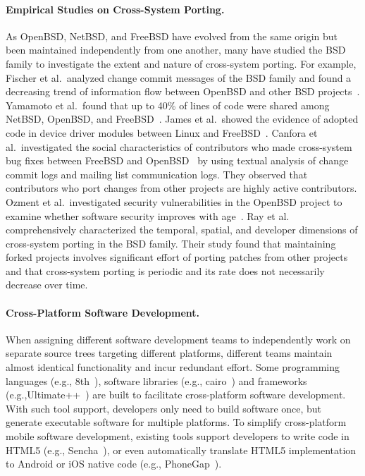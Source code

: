 \paragraph{{Empirical Studies on Cross-System Porting.}}
As OpenBSD, NetBSD, and FreeBSD have evolved from the same origin but been maintained independently from one another, many have studied the BSD family to investigate the extent and nature of cross-system porting. For example, Fischer et al.~analyzed change commit messages of the BSD family and found a decreasing trend of information flow between OpenBSD and other BSD projects~\cite{Fischer2005}. Yamamoto et al.~found that up to 40\% of lines of code were shared among NetBSD, OpenBSD, and FreeBSD~\cite{Yamamoto2005}. James et al.~showed the evidence of adopted code in device driver modules between Linux and FreeBSD~\cite{Cordy2011:largecloning}. Canfora et al.~investigated the social characteristics of contributors who made cross-system bug fixes between FreeBSD and OpenBSD~\cite{Canfora2011:bsdfork} by using textual analysis of change commit logs and mailing list communication logs. They observed that contributors who port changes from other projects are highly active contributors. Ozment et al.~investigated security vulnerabilities in the OpenBSD project to examine whether software security improves with age~\cite{Ozment2006}. Ray et al.~\cite{Ray2012:FSE} comprehensively characterized the temporal, spatial, and developer dimensions of cross-system porting in the BSD family. Their study found that maintaining forked projects involves significant effort of porting patches from other projects and that cross-system porting  is periodic and its rate does not necessarily decrease over time. %

\paragraph{{Cross-Platform Software Development.}}
When assigning different software development teams to independently work on separate source trees targeting different platforms, different teams maintain almost identical functionality and incur redundant effort. Some programming languages (e.g., 8th~\cite{8th}), software libraries (e.g., cairo~\cite{cairo}) and frameworks (e.g.,Ultimate++~\cite{ultimate}) are built to facilitate cross-platform software development. With such tool support, developers only need to build software once, but generate executable software for multiple platforms. %
To simplify cross-platform mobile software development, existing tools support developers to write code in HTML5 (e.g., Sencha~\cite{sencha}), or even automatically translate HTML5 implementation to Android or iOS native code (e.g., PhoneGap~\cite{phonegap}).

